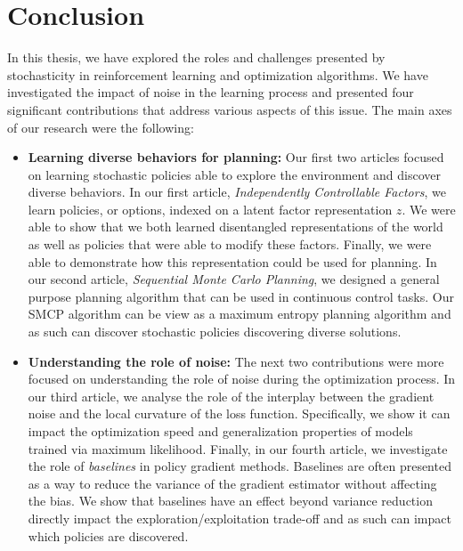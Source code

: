  \chapter*{Conclusion}

In this thesis, we have explored the roles and challenges presented by
stochasticity in reinforcement learning and optimization algorithms. We have
investigated the impact of noise in the learning process and presented four significant contributions that address various aspects of this issue.
The main axes of our research were the following:

\begin{itemize}
    \item \textbf{Learning diverse behaviors for planning:}
        Our first two articles focused on learning stochastic policies able to
        explore the environment and discover diverse behaviors. In our first
        article, \emph{Independently Controllable Factors}, we learn policies,
        or options, indexed on a latent factor representation $z$. We were able
        to show that we both learned disentangled representations of the world
        as well as policies that were able to modify these factors. Finally, we
        were able to demonstrate how this representation could be used for
        planning.
        In our second article, \emph{Sequential Monte Carlo Planning}, we
        designed a general purpose planning algorithm that can be used in
        continuous control tasks. Our SMCP algorithm can be view as a maximum
        entropy planning algorithm and as such can discover stochastic policies
        discovering diverse solutions.
    \item \textbf{Understanding the role of noise:} The next two contributions
        were more focused on understanding the role of noise during the
        optimization process. In our third article, we analyse the role of the
        interplay between the gradient noise and the local curvature of the loss
        function. Specifically, we show it can impact the optimization speed and
        generalization properties of models trained via maximum likelihood.
        Finally, in our fourth article, we investigate the role of
        \emph{baselines} in policy gradient methods. Baselines are often
        presented as a way to reduce the variance of the gradient estimator
        without affecting the bias. We show that baselines have an effect beyond
        variance reduction directly impact the
        exploration/exploitation trade-off and as such can impact which policies
        are discovered.
\end{itemize}


